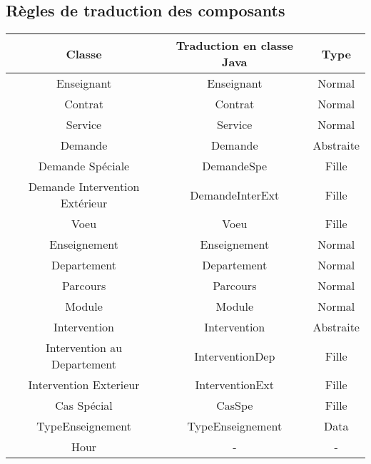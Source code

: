     \subsection{Règles de traduction des composants}
    \begin{center}
        \begin{tabular}{|c|c|c|}
            \hline
            Classe & Traduction en classe Java & Type\\
            \hline
            
            Enseignant & Enseignant & Normal\\
            
            Contrat & Contrat & Normal\\
            Service & Service & Normal\\
            
            Demande & Demande & Abstraite\\
            Demande Spéciale & DemandeSpe & Fille\\
            Demande Intervention Extérieur & DemandeInterExt & Fille\\
            Voeu & Voeu & Fille\\
            
            Enseignement & Enseignement & Normal\\
            
            Departement & Departement & Normal\\
            Parcours & Parcours & Normal\\
            Module & Module & Normal\\
            
            Intervention & Intervention & Abstraite\\
            Intervention au Departement & InterventionDep & Fille\\
            Intervention Exterieur & InterventionExt & Fille\\
            Cas Spécial & CasSpe & Fille\\
            
            TypeEnseignement & TypeEnseignement & Data\\

            Hour & - & -\\
            
            \hline
        \end{tabular}
    \end{center}
    
